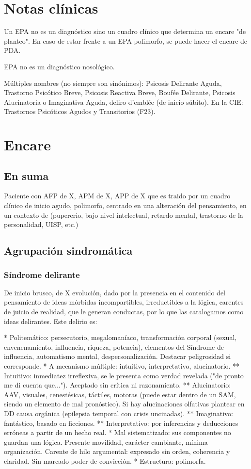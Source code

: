 \documentclass{scrbook}
\begin{document}
\section*{Notas clínicas}
Un EPA no es un diagnóstico sino un cuadro clínico que determina un encare "de planteo". En caso de estar frente a un EPA polimorfo, se puede hacer el encare de PDA.

\faStopCircle EPA no es un diagnóstico nosológico.

Múltiples nombres (no siempre son sinónimos): Psicosis Delirante Aguda, Trastorno Psicótico Breve, Psicosis Reactiva Breve, Boufée Delirante, Psicosis Alucinatoria o Imaginativa Aguda, deliro d'emblée (de inicio súbito). En la CIE: Trastornos Psicóticos Agudos y Transitorios (F23).
\section*{Encare}
\subsection*{En suma}
Paciente con AFP de X, APM de X, APP de X que es traido por un cuadro clínico de inicio agudo, polimorfo, centrado en una alteración del pensamiento, en un contexto de (pupererio, bajo nivel intelectual, retardo mental, trastorno de la personalidad, UISP, etc.)
\subsection*{Agrupación sindromática}
\subsubsection*{Síndrome delirante}
De inicio brusco, de X evolución, dado por la presencia en el contenido del pensamiento de ideas mórbidas incompartibles, irreductibles a la lógica, carentes de juicio de realidad, que le generan conductas, por lo que las catalogamos como ideas delirantes. Este delirio es:

* Politemático: persecutorio, megalomaníaco, transformación corporal (sexual, envenenamiento, influencia, riqueza, potencia), elementos del Síndrome de influencia, automatismo mental, despersonalización. Destacar peligrosidad si corresponde.
* A mecanismo múltiple: intuitivo, interpretativo, alucinatorio.
** Intuitivo: inmediatez irreflexiva, se le presenta como verdad revelada ("de pronto me di cuenta que..."). Aceptado sin crítica ni razonamiento.
** Alucinatorio: AAV, visuales, cenestésicas, táctiles, motoras (puede estar dentro de un SAM, siendo un elemento de mal pronóstico). Si hay alucinaciones olfativas plantear en DD causa orgánica (epilepsia temporal con crisis uncinadas).
** Imaginativo: fantástico, basado en ficciones.
** Interpretativo: por inferencias y deducciones erróneas a partir de un hecho real.
* Mal sistematizado: sus componentes no guardan una lógica. Presente movilidad, carácter cambiante, mínima organización. Carente de hilo argumental: expresado sin orden, coherencia y claridad. Sin marcado poder de convicción.
* Estructura: polimorfa.
\end{document}
